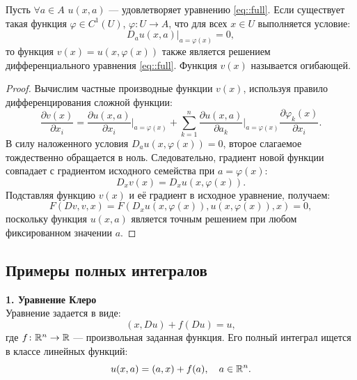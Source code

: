 \begin{proposition}
  Пусть  $\forall a\in A$ $u(x, a)$ --- удовлетворяет уравнению \eqref{eq::full}. 
  Если существует такая функция $\varphi \in C^1(U)$,
  $\varphi \colon U \to A$, 
  что для всех $x \in U$ выполняется условие:
  \begin{equation}
      D_a u(x, a) \big|_{a = \varphi(x)} = 0,
  \end{equation}
  то функция $v(x) = u(x, \varphi(x))$ также является решением 
  дифференциального уравнения \eqref{eq::full}.
  Функция $v(x)$ называется огибающей. 
\end{proposition}

\begin{proof}
    Вычислим частные производные функции $v(x)$, используя правило дифференцирования сложной функции:
    \begin{equation}
        \frac{\partial v(x)}{\partial x_i} = \frac{\partial u(x, a)}{\partial x_i} \bigg|_{a=\varphi(x)} 
        + \sum_{k=1}^n \frac{\partial u(x, a)}{\partial a_k} \bigg|_{a=\varphi(x)} \frac{\partial \varphi_k(x)}{\partial x_i}.
    \end{equation}
    В силу наложенного условия $D_a u(x, \varphi(x)) = 0$, второе слагаемое тождественно обращается в ноль. 
    Следовательно, градиент новой функции совпадает с градиентом исходного семейства при $a = \varphi(x)$:
    \begin{equation}
        D_x v(x) = D_x u(x, \varphi(x)).
    \end{equation}
    Подставляя функцию $v(x)$ и её градиент в исходное уравнение, получаем:
    \begin{equation}
        F(Dv, v, x) = F(D_x u(x, \varphi(x)), u(x, \varphi(x)), x) = 0,
    \end{equation}
    поскольку функция $u(x, a)$ является точным решением при любом фиксированном значении $a$.
\end{proof}

\subsection{Примеры полных интегралов}
\textbf{1. Уравнение Клеро}\\
Уравнение задается в виде:
\begin{equation}
    (x, Du) + f(Du) = u,
\end{equation}
где $f \colon \mathbb{R}^n \to \mathbb{R}$ --- произвольная заданная функция. 
Его полный интеграл ищется в классе линейных функций:
\begin{equation}
    u(x, a) = (a, x) + f(a), \quad a \in \mathbb{R}^n.
\end{equation}

